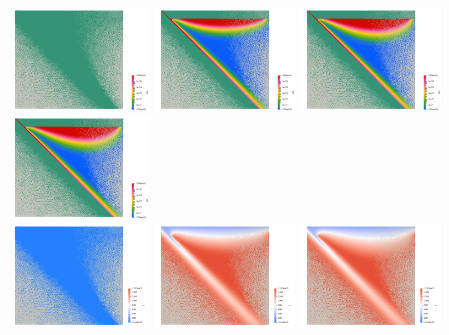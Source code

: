 \begin{center}
\includegraphics[width=3.74cm]{python_codes/fieldstone_68/results/case2a/eta0000}
\includegraphics[width=3.74cm]{python_codes/fieldstone_68/results/case2a/eta0009}
\includegraphics[width=3.74cm]{python_codes/fieldstone_68/results/case2a/eta0019}
\includegraphics[width=3.74cm]{python_codes/fieldstone_68/results/case2a/eta0028}\\
\includegraphics[width=3.74cm]{python_codes/fieldstone_68/results/case2a/T0000}
\includegraphics[width=3.74cm]{python_codes/fieldstone_68/results/case2a/T0009}
\includegraphics[width=3.74cm]{python_codes/fieldstone_68/results/case2a/T0019}

\end{center}
